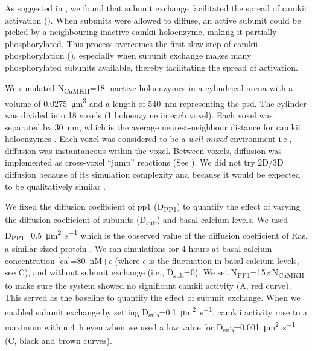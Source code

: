 \documentclass[9pt,lineno,doublespacing]{elife}
\newcommand\SUB[2]{#1\textsubscript{#2}}
\begin{document}
As suggested in \citep{stratton_activation-triggered_2014}, we found that
subunit exchange facilitated the spread of \gls{camkii} activation
(). When subunits were allowed to diffuse, an
active subunit could be picked by a neighbouring inactive \gls{camkii}
holoenzyme, making it partially phosphorylated. This process overcomes the first
slow step of \gls{camkii} phosphorylation (), especially when
subunit exchange makes many phosphorylated subunits available, thereby
facilitating the spread of activation.

We simulated \SUB{N}{CaMKII}=18 inactive holoenzymes in a cylindrical arena
with a volume of \SI{0.0275}{\cubic\micro\meter} and a length of
\SI{540}{\nano\meter} representing the \gls{psd}. The cylinder was divided into
18 voxels (1 holoenzyme in each voxel). Each voxel was separated by
\SI{30}{\nano\meter}, which is the average nearest-neighbour distance for
\gls{camkii} holoenzymes \citep{feng_quantitative_2011}. Each voxel was
considered to be a \emph{well-mixed} environment i.e., diffusion was
instantaneous within the voxel. Between voxels, diffusion was implemented as
cross-voxel ``jump'' reactions (See ). We did
not try 2D/3D diffusion because of its simulation complexity and because it
would be expected to be qualitatively similar \citep{fange_stochastic_2010}.

We fixed the diffusion coefficient of \gls{pp1} (\SUB{D}{PP1}) to quantify the
effect of varying the diffusion coefficient of subunits (\SUB{D}{sub}) and basal
calcium levels. We used \SUB{D}{PP1}=\SI{0.5}{\micro\meter\squared\per\second}
which is the observed value of the diffusion coefficient of Ras, a similar sized
protein \citep{harvey_spread_2008}. We ran simulations for 4 hours at basal
calcium concentration [\gls{ca}]=\SI{80}{\nano M}+$\epsilon$ (where $\epsilon$
is the fluctuation in basal calcium levels, see C), and without subunit
exchange (i.e., \SUB{D}{sub}=0). We set \SUB{N}{PP1}=15$\times$\SUB{N}{CaMKII}
to make sure the system showed no significant \gls{camkii} activity
(A, red curve). This served as the baseline to
quantify the effect of subunit exchange. When we enabled subunit exchange by
setting \SUB{D}{sub}=\SI{0.1}{\micro\meter\squared\per\second}, \gls{camkii}
activity rose to a maximum within \SI{4}{\hour} even when we used a low value
for \SUB{D}{sub}=\SI{0.001}{\micro\meter\squared\per\second}
(C, black and brown curves).
\end{document}
